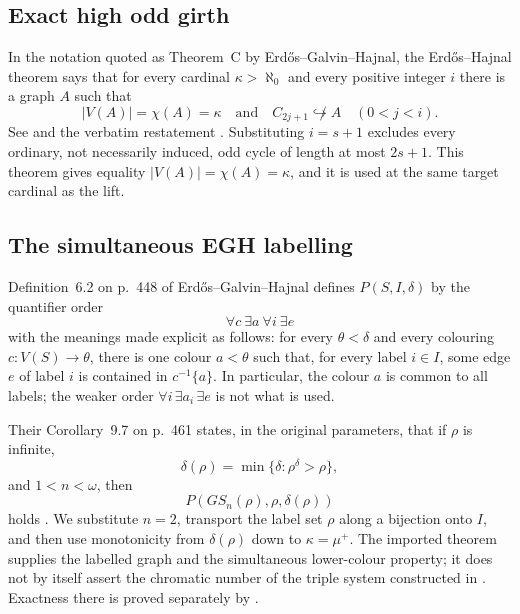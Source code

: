 \documentclass[11pt]{amsart}
\theoremstyle{definition}
\theoremstyle{remark}
\numberwithin{equation}{section}
\begin{document}
\subsection{Exact high odd girth}

In the notation quoted as Theorem~C by Erd\H{o}s--Galvin--Hajnal, the
Erd\H{o}s--Hajnal theorem says that for every cardinal $\kappa>\aleph_0$
and every positive integer $i$ there is a graph $A$ such that
\[
 |V(A)|=\chi(A)=\kappa
 \quad\text{and}\quad
 C_{2j+1}\not\hookrightarrow A\quad(0<j<i).
\]
See \cite[Theorem~7.4, p.~76]{EH1966} and the verbatim restatement
\cite[Theorem~C, p.~428]{EGH}.  Substituting $i=s+1$ excludes every
ordinary, not necessarily induced, odd cycle of length at most $2s+1$.
This theorem gives equality $|V(A)|=\chi(A)=\kappa$, and it is used at the
same target cardinal as the lift.

\subsection{The simultaneous EGH labelling}

Definition~6.2 on p.~448 of Erd\H{o}s--Galvin--Hajnal defines
$P(S,I,\delta)$ by the quantifier order
\begin{equation}
 \boxed{
 \forall c\ \exists a\ \forall i\ \exists e
 }
 \label{eq:EGH-quantifier-order}
\end{equation}
with the meanings made explicit as follows: for every $\theta<\delta$ and
every colouring $c:V(S)\to\theta$, there is one colour $a<\theta$ such
that, for every label $i\in I$, some edge $e$ of label $i$ is contained in
$c^{-1}\{a\}$.  In particular, the colour $a$ is common to all labels; the
weaker order $\forall i\,\exists a_i\,\exists e$ is not what is used.

Their Corollary~9.7 on p.~461 states, in the original parameters, that if
$\rho$ is infinite,
\[
 \delta(\rho)=\min\{\delta:\rho^\delta>\rho\},
\]
and $1<n<\omega$, then
\[
 P(GS_n(\rho),\rho,\delta(\rho))
\]
holds \cite[Definition~6.2, p.~448 and Corollary~9.7, p.~461]{EGH}.  We
substitute $n=2$, transport the label set $\rho$ along a bijection onto
$I$, and then use monotonicity from $\delta(\rho)$ down to
$\kappa=\mu^+$.  The imported theorem supplies the labelled graph and the
simultaneous lower-colour property; it does not by itself assert the
chromatic number of the triple system constructed in
.  Exactness there is proved separately by
.
\end{document}
